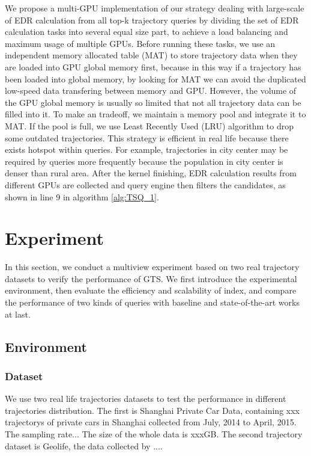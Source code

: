 \documentclass[conference]{IEEEtran}
\begin{document}
We propose a multi-GPU implementation of our strategy dealing with large-scale of EDR calculation from all top-k trajectory queries by dividing the set of EDR calculation tasks into several equal size part, to achieve a load balancing and maximum usage of multiple GPUs. Before running these tasks, we use an independent memory allocated table (MAT) to store trajectory data when they are loaded into GPU global memory first, because in this way if a trajectory has been loaded into global memory, by looking for MAT we can avoid the duplicated low-speed data transfering between memory and GPU. However, the volume of the GPU global memory is usually so limited that not all trajectory data can be filled into it. To make an tradeoff, we maintain a memory pool and integrate it to MAT. If the pool is full, we use Least Recently Used (LRU) algorithm to drop some outdated trajectories. This strategy is efficient in real life because there exists hotspot within queries. For example, trajectories in city center may be required by queries more frequently because the population in city center is denser than rural area. After the kernel finishing, EDR calculation results from different GPUs are collected and query engine then filters the candidates, as shown in line 9 in algorithm \ref{alg:TSQ_1}. 


\section{Experiment}
In this section, we conduct a multiview experiment based on two real trajectory datasets to verify the performance of GTS. We first introduce the experimental environment, then evaluate the efficiency and scalability of index, and compare the performance of two kinds of queries with baseline and state-of-the-art works at last.
 
\subsection{Environment}
\subsubsection{Dataset}
We use two real life trajectories datasets to test the performance in different trajectories distribution. The first is Shanghai Private Car Data, containing xxx trajectorys of private cars in Shanghai collected from July, 2014 to April, 2015. The sampling rate...  The size of the whole data is xxxGB. The second trajectory dataset is Geolife, the data collected by ....
\end{document}
